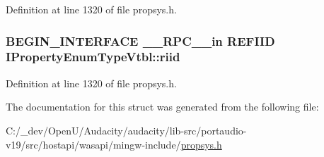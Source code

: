 Definition at line 1320 of file propsys.\+h.

\subsubsection[{\texorpdfstring{riid}{riid}}]{\setlength{\rightskip}{0pt plus 5cm}B\+E\+G\+I\+N\+\_\+\+I\+N\+T\+E\+R\+F\+A\+CE {\bf \+\_\+\+\_\+\+R\+P\+C\+\_\+\+\_\+in} {\bf R\+E\+F\+I\+ID} I\+Property\+Enum\+Type\+Vtbl\+::riid}\hypertarget{struct_i_property_enum_type_vtbl_a0036b34595dd32ce7dd0726d302cb6dc}{}\label{struct_i_property_enum_type_vtbl_a0036b34595dd32ce7dd0726d302cb6dc}


Definition at line 1320 of file propsys.\+h.



The documentation for this struct was generated from the following file\+:\begin{DoxyCompactItemize}
\item 
C\+:/\+\_\+dev/\+Open\+U/\+Audacity/audacity/lib-\/src/portaudio-\/v19/src/hostapi/wasapi/mingw-\/include/\hyperlink{propsys_8h}{propsys.\+h}\end{DoxyCompactItemize}
